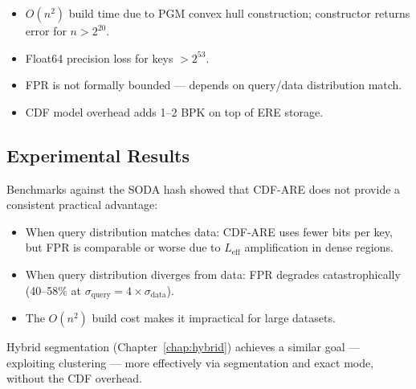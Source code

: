 \begin{itemize}
  \item $O(n^2)$ build time due to PGM convex hull construction; constructor returns
    error for $n > 2^{20}$.
  \item Float64 precision loss for keys $> 2^{53}$.
  \item FPR is not formally bounded --- depends on query/data distribution match.
  \item CDF model overhead adds 1--2 BPK on top of ERE storage.
\end{itemize}

\subsection{Experimental Results}

Benchmarks against the SODA hash showed that CDF-ARE does not provide a consistent
practical advantage:
\begin{itemize}
  \item When query distribution matches data: CDF-ARE uses fewer bits per key, but FPR
    is comparable or worse due to $L_\text{eff}$ amplification in dense regions.
  \item When query distribution diverges from data: FPR degrades catastrophically
    (40--58\% at $\sigma_\text{query} = 4 \times \sigma_\text{data}$).
  \item The $O(n^2)$ build cost makes it impractical for large datasets.
\end{itemize}

Hybrid segmentation (Chapter~\ref{chap:hybrid}) achieves a similar goal --- exploiting
clustering --- more effectively via segmentation and exact mode, without the CDF overhead.
